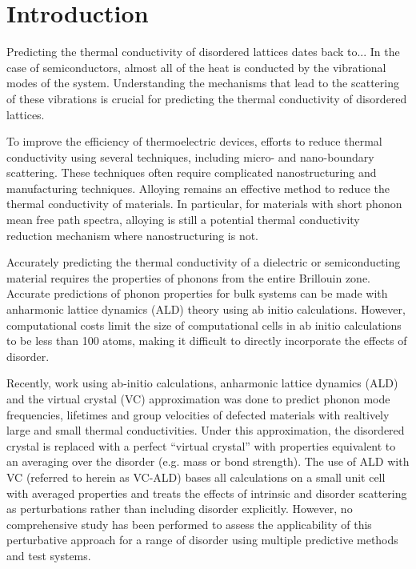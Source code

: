 \documentclass[aps,prb,twocolumn,superscriptaddress,amsmath,amssymb,floatfix]{revtex4}
\begin{document}
\section{\label{S:Introduction}Introduction}

Predicting the thermal conductivity of disordered lattices dates back to...
In the case of semiconductors, almost all of the heat is conducted by
the vibrational modes of the system. Understanding the mechanisms that lead 
to the scattering of these vibrations is crucial for predicting the 
thermal conductivity of disordered lattices.

To improve the efficiency of thermoelectric devices, 
efforts to reduce thermal conductivity using several techniques, 
including 
micro- and nano-boundary scattering. These techniques often require 
complicated nanostructuring and manufacturing techniques. 
Alloying remains an effective method to reduce the thermal conductivity 
of materials. In particular, for materials with short phonon mean free path 
spectra, alloying is still a potential thermal conductivity reduction 
mechanism where nanostructuring is not.\cite{tian_phonon_2012}

Accurately predicting the thermal conductivity of a dielectric or 
semiconducting material requires the properties of phonons from the entire 
Brillouin zone. Accurate predictions of phonon properties for bulk systems 
can be made with anharmonic lattice dynamics (ALD) theory 
using ab initio 
calculations.\cite{ward_intrinsic_2010,lindsay_thermal_2012,
garg_role_2011,
shiga_microscopic_2012,tian_phonon_2012,
shiomi_thermal_2011,esfarjani_heat_2011}
However, computational costs limit the size of computational cells 
in ab initio calculations to be less than 100 atoms, making it difficult 
to directly incorporate the effects of disorder.
\cite{koker_thermal_2009,bao_first-principles_2012,
lindsay_thermal_2012,tian_phonon_2012,garg_role_2011}

Recently, work using ab-initio calculations, anharmonic 
lattice dynamics (ALD) and the virtual crystal (VC) 
approximation was done to predict phonon mode frequencies, lifetimes and 
group velocities of defected materials with realtively
large\cite{garg_role_2011,lindsay_thermal_2012} 
and 
small\cite{tian_phonon_2012} 
thermal conductivities. 
Under this approximation, the disordered 
crystal is replaced with a perfect “virtual crystal” with properties 
equivalent to an averaging over the disorder (e.g. mass or bond 
strength).\cite{abeles_lattice_1963}
The use of ALD with VC (referred to herein as VC-ALD) bases 
all calculations on a small unit cell with averaged properties and 
treats the effects of intrinsic and disorder scattering as perturbations 
rather than including disorder explicitly.
\cite{abeles_lattice_1963,tamura_isotope_1983,
tian_phonon_2012,lindsay_thermal_2012} 
However, no comprehensive study has been performed 
to assess the applicability of this perturbative approach for a range 
of disorder using multiple predictive methods and test systems.
\end{document}
